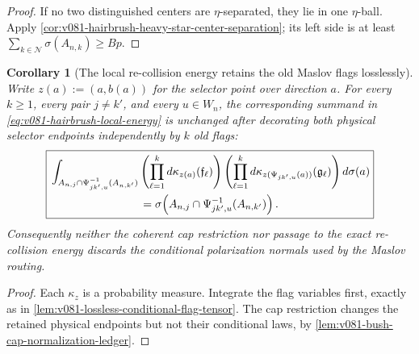 \documentclass[10pt]{article}
\newtheorem{corollary}[theorem]{Corollary}
\begin{document}
\begin{proof}
If no two distinguished centers are \(\eta\)-separated, they lie in one \(\eta\)-ball.  Apply
\cref{cor:v081-hairbrush-heavy-star-center-separation}; its left side is at least
\(\sum_{k\in\mathcal N}\sigma(A_{n,k})\ge Bp\).
\end{proof}

\begin{corollary}[The local re-collision energy retains the old Maslov flags losslessly]
\label{cor:v081-hairbrush-energy-flag-lift}
Write \(z(a):=(a,b(a))\) for the selector point over direction \(a\).  For every \(k\ge1\), every
pair \(j\ne k'\), and every \(u\in W_n\), the corresponding summand in
\eqref{eq:v081-hairbrush-local-energy} is unchanged after decorating both physical selector
endpoints independently by \(k\) old flags:
\begin{equation}
\label{eq:v081-hairbrush-flagged-energy}
\boxed{
\begin{aligned}
&\int_{A_{n,j}\cap\Psi_{jk',u}^{-1}(A_{n,k'})}
\left(\prod_{\ell=1}^k d\kappa_{z(a)}(\mathfrak f_\ell)\right)
\left(\prod_{\ell=1}^k
d\kappa_{z(\Psi_{jk',u}(a))}(\mathfrak g_\ell)\right)d\sigma(a)\\
&\hspace{28mm}=
\sigma\!\left(A_{n,j}\cap\Psi_{jk',u}^{-1}(A_{n,k'})\right).
\end{aligned}
}
\end{equation}
Consequently neither the coherent cap restriction nor passage to the exact re-collision energy
discards the conditional polarization normals used by the Maslov routing.
\end{corollary}

\begin{proof}
Each \(\kappa_z\) is a probability measure.  Integrate the flag variables first, exactly as in
\cref{lem:v081-lossless-conditional-flag-tensor}.  The cap restriction changes the retained
physical endpoints but not their conditional laws, by
\cref{lem:v081-bush-cap-normalization-ledger}.
\end{proof}
\end{document}
